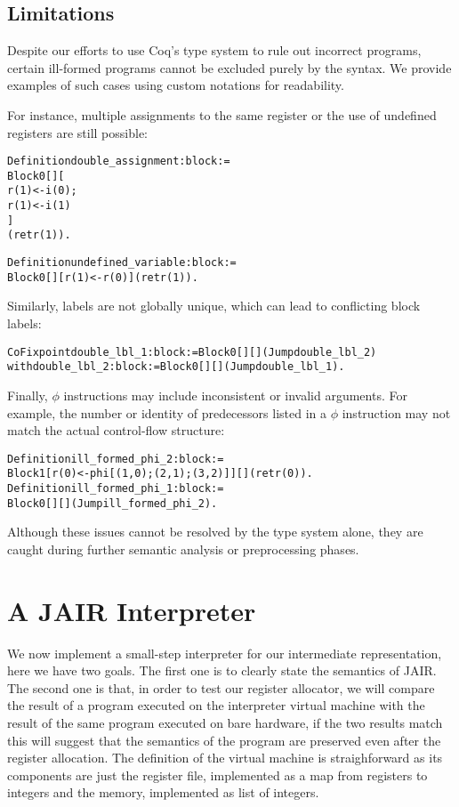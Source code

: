 \subsection{Limitations}
\label{subsec:limitations}

Despite our efforts to use Coq's type system to rule out incorrect programs, certain ill-formed programs cannot be excluded purely by the syntax. We provide examples of such cases using custom notations for readability.

For instance, multiple assignments to the same register or the use of undefined registers are still possible:

\begin{alltt}
Definition double_assignment : block :=
  Block 0 [] [
    r(1) <- i(0);
    r(1) <- i(1)
  ]
  (ret r(1)).

Definition undefined_variable : block :=
  Block 0 [] [r(1) <- r(0)] (ret r(1)).
\end{alltt}

Similarly, labels are not globally unique, which can lead to conflicting block labels:

\begin{alltt}
CoFixpoint double_lbl_1 : block := Block 0 [] [] (Jump double_lbl_2)
  with double_lbl_2 : block := Block 0 [] [] (Jump double_lbl_1).
\end{alltt}

Finally, $\phi$ instructions may include inconsistent or invalid arguments. For example, the number or identity of predecessors listed in a $\phi$ instruction may not match the actual control-flow structure:

\begin{alltt}
Definition ill_formed_phi_2 : block :=
  Block 1 [r(0) <- phi [(1, 0); (2, 1); (3, 2)]] [] (ret r(0)).
Definition ill_formed_phi_1 : block :=
  Block 0 [] [] (Jump ill_formed_phi_2).
\end{alltt}

Although these issues cannot be resolved by the type system alone, they are caught during further semantic analysis or preprocessing phases.

\section{A JAIR Interpreter}
\label{sec:jair-int}

We now implement a small-step interpreter for our intermediate representation, here we have two goals.
The first one is to clearly state the semantics of JAIR. The second one is that, in order to test our register allocator, we will compare the result of a program executed on the interpreter virtual machine with the result of the same program executed on bare hardware, if the two results match this will suggest that the semantics of the program are preserved even after the register allocation.
The definition of the virtual machine is straighforward as its components are just the register file, implemented as a map from registers to integers and the memory, implemented as list of integers.

